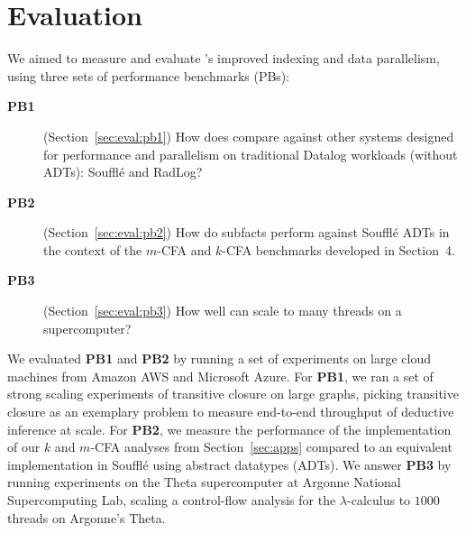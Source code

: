 \section{Evaluation}
\label{sec:eval}

We aimed to measure and evaluate \slog{}'s
improved indexing and data parallelism, using
three sets of performance benchmarks (PBs):

\begin{description}
\item[\textbf{PB1}] (Section~\ref{sec:eval:pb1}) How does \slog{} compare against other systems
  designed for performance and parallelism on traditional Datalog
  workloads (without ADTs): Souffl\'e and RadLog?
\item[\textbf{PB2}] (Section~\ref{sec:eval:pb2}) How do \slog{} subfacts perform against Souffl\'e ADTs
  in the context of the $m$-CFA and $k$-CFA benchmarks developed in Section~4.
\item[\textbf{PB3}] (Section~\ref{sec:eval:pb3}) How well can \slog{} scale to many threads on a supercomputer?
\end{description}

We evaluated \textbf{PB1} and \textbf{PB2} by running a set of
experiments on large cloud machines from Amazon AWS and Microsoft
Azure. For \textbf{PB1}, we ran a set of strong scaling experiments of
transitive closure on large graphs, picking transitive closure as an
exemplary problem to measure end-to-end throughput of deductive
inference at scale. For \textbf{PB2}, we measure the performance of
the implementation of our $k$ and $m$-CFA analyses from
Section~\ref{sec:apps} compared to an equivalent implementation in
Souffl\'e using abstract datatypes (ADTs). We answer \textbf{PB3} by
running experiments on the Theta supercomputer at Argonne National
Supercomputing Lab, scaling a control-flow analysis for the
$\lambda$-calculus to $1000$ threads on Argonne's Theta.







